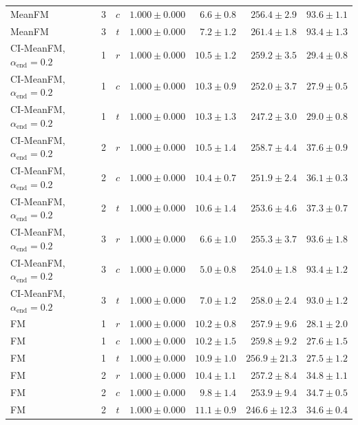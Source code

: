 \begin{table}[htpb]
\begin{tabularx}{\linewidth}{@{}L r c rrrr@{}}
    MeanFM & 3 & $c$ & $1.000 \pm 0.000$ & $6.6 \pm 0.8$ & $256.4 \pm 2.9$ & $93.6 \pm 1.1$ \\
    MeanFM & 3 & $t$ & $1.000 \pm 0.000$ & $7.2 \pm 1.2$ & $261.4 \pm 1.8$ & $93.4 \pm 1.3$ \\
    \addlinespace[2pt]
    CI-MeanFM, $\alpha_{\mathrm{end}}=0.2$ & 1 & $r$ & $1.000 \pm 0.000$ & $10.5 \pm 1.2$ & $259.2 \pm 3.5$ & $29.4 \pm 0.8$ \\
    CI-MeanFM, $\alpha_{\mathrm{end}}=0.2$ & 1 & $c$ & $1.000 \pm 0.000$ & $10.3 \pm 0.9$ & $252.0 \pm 3.7$ & $27.9 \pm 0.5$ \\
    CI-MeanFM, $\alpha_{\mathrm{end}}=0.2$ & 1 & $t$ & $1.000 \pm 0.000$ & $10.3 \pm 1.3$ & $247.2 \pm 3.0$ & $29.0 \pm 0.8$ \\
    \addlinespace[2pt]
    CI-MeanFM, $\alpha_{\mathrm{end}}=0.2$ & 2 & $r$ & $1.000 \pm 0.000$ & $10.5 \pm 1.4$ & $258.7 \pm 4.4$ & $37.6 \pm 0.9$ \\
    CI-MeanFM, $\alpha_{\mathrm{end}}=0.2$ & 2 & $c$ & $1.000 \pm 0.000$ & $10.4 \pm 0.7$ & $251.9 \pm 2.4$ & $36.1 \pm 0.3$ \\
    CI-MeanFM, $\alpha_{\mathrm{end}}=0.2$ & 2 & $t$ & $1.000 \pm 0.000$ & $10.6 \pm 1.4$ & $253.6 \pm 4.6$ & $37.3 \pm 0.7$ \\
    \addlinespace[2pt]
    CI-MeanFM, $\alpha_{\mathrm{end}}=0.2$ & 3 & $r$ & $1.000 \pm 0.000$ & $6.6 \pm 1.0$ & $255.3 \pm 3.7$ & $93.6 \pm 1.8$ \\
    CI-MeanFM, $\alpha_{\mathrm{end}}=0.2$ & 3 & $c$ & $1.000 \pm 0.000$ & $5.0 \pm 0.8$ & $254.0 \pm 1.8$ & $93.4 \pm 1.2$ \\
    CI-MeanFM, $\alpha_{\mathrm{end}}=0.2$ & 3 & $t$ & $1.000 \pm 0.000$ & $7.0 \pm 1.2$ & $258.0 \pm 2.4$ & $93.0 \pm 1.2$ \\
    \addlinespace[2pt]
    FM & 1 & $r$ & $1.000 \pm 0.000$ & $10.2 \pm 0.8$ & $257.9 \pm 9.6$ & $28.1 \pm 2.0$ \\
    FM & 1 & $c$ & $1.000 \pm 0.000$ & $10.2 \pm 1.5$ & $259.8 \pm 9.2$ & $27.6 \pm 1.5$ \\
    FM & 1 & $t$ & $1.000 \pm 0.000$ & $10.9 \pm 1.0$ & $256.9 \pm 21.3$ & $27.5 \pm 1.2$ \\
    \addlinespace[2pt]
    FM & 2 & $r$ & $1.000 \pm 0.000$ & $10.4 \pm 1.1$ & $257.2 \pm 8.4$ & $34.8 \pm 1.1$ \\
    FM & 2 & $c$ & $1.000 \pm 0.000$ & $9.8 \pm 1.4$ & $253.9 \pm 9.4$ & $34.7 \pm 0.5$ \\
    FM & 2 & $t$ & $1.000 \pm 0.000$ & $11.1 \pm 0.9$ & $246.6 \pm 12.3$ & $34.6 \pm 0.4$ \\

\end{tabularx}
\end{table}
